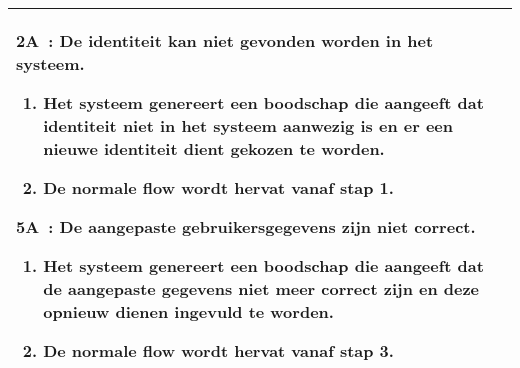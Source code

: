 \documentclass{article}
\begin{document}
\begin{tabularx}{\textwidth}{ | l | X |}
  
   	\textbf{2A~:} De identiteit kan niet gevonden worden in het systeem.
 	\begin{enumerate}[label=\alph*]
        \item Het systeem genereert een boodschap die aangeeft dat identiteit niet in het systeem aanwezig is en er een nieuwe identiteit dient gekozen te worden.
        \item De normale flow wordt hervat vanaf stap 1.
 	\end{enumerate}
    
    
      \textbf{5A~:} De aangepaste gebruikersgegevens zijn niet correct.
 	\begin{enumerate}[label=\alph*]
    	\item Het systeem genereert een boodschap die aangeeft dat de aangepaste gegevens niet meer correct zijn en deze opnieuw dienen ingevuld te worden.
 		\item De normale flow wordt hervat vanaf stap 3.
 	\end{enumerate}
 \\
 \hline

 \end{tabularx}
 
 \newpage
\end{document}
